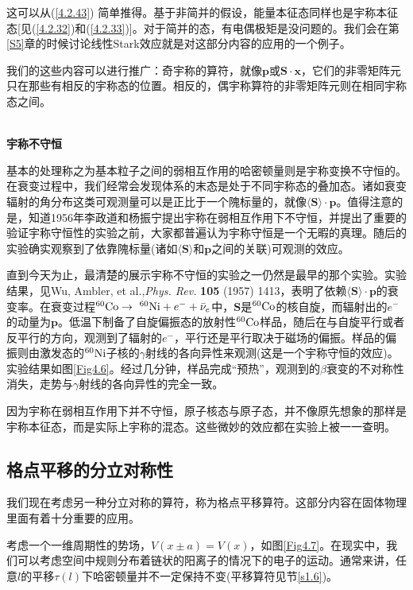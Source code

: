 \documentclass[UTF8,twoside]{ctexart}
\begin{document}
\noindent 这可以从(\ref{4.2.43}) 简单推得。基于非简并的假设，能量本征态同样也是宇称本征态[见(\ref{4.2.32})和(\ref{4.2.33})]。对于简并的态，有电偶极矩是没问题的。我们会在第{\ref{S5}}章的时候讨论线性Stark效应就是对这部分内容的应用的一个例子。

我们的这些内容可以进行推广：奇宇称的算符，就像$\bm{p}$或$\bm{S}\cdot\bm{x}$，它们的非零矩阵元只在那些有相反的宇称态的位置。相反的，偶宇称算符的非零矩阵元则在相同宇称态之间。

\ \\

\noindent \textbf{宇称不守恒}

\noindent 基本的处理称之为基本粒子之间的弱相互作用的哈密顿量则是宇称变换不守恒的。在衰变过程中，我们经常会发现体系的末态是处于不同宇称态的叠加态。诸如衰变辐射的角分布这类可观测量可以是正比于一个隗标量的，就像$\langle\bm{S}\rangle\cdot\bm{p}$。值得注意的是，知道1956年李政道和杨振宁提出宇称在弱相互作用下不守恒，并提出了重要的验证宇称守恒性的实验之前，大家都普遍认为宇称守恒是一个无暇的真理。随后的实验确实观察到了依靠隗标量(诸如$\langle \bm{S}\rangle$和$\bm{p}$之间的关联)可观测的效应。

直到今天为止，最清楚的展示宇称不守恒的实验之一仍然是最早的那个实验。实验结果，见Wu, Ambler, et al.,\emph{Phys. Rev. }\textbf{105} (1957) 1413，表明了依赖$\langle \bm{S}\rangle \cdot \bm{p}$的衰变率。在衰变过程$^{60}\ce{Co}\rightarrow\ ^{60}\ce{Ni}+e^-+\bar{\nu}_e$中，$\bm{S}$是$^{60}\ce{Co}$的核自旋，而辐射出的$e^-$的动量为$\bm{p}$。低温下制备了自旋偏振态的放射性$^{60}\ce{Co}$样品，随后在与自旋平行或者反平行的方向，观测到了辐射的$e^-$，平行还是平行取决于磁场的偏振。样品的偏振则由激发态的$^{60}\ce{Ni}$子核的$\gamma$射线的各向异性来观测(这是一个宇称守恒的效应)。实验结果如图{\ref{Fig4.6}}。经过几分钟，样品完成``预热''，观测到的$\beta$衰变的不对称性消失，走势与$\gamma$射线的各向异性的完全一致。

因为宇称在弱相互作用下并不守恒，原子核态与原子态，并不像原先想象的那样是宇称本征态，而是实际上宇称的混态。这些微妙的效应都在实验上被一一查明。

\subsection{格点平移的分立对称性}

\noindent 我们现在考虑另一种分立对称的算符，称为格点平移算符。这部分内容在固体物理里面有着十分重要的应用。

考虑一个一维周期性的势场，$V(x\pm a) = V(x)$，如图{\ref{Fig4.7}}。在现实中，我们可以考虑空间中规则分布着链状的阳离子的情况下的电子的运动。通常来讲，任意$l$的平移$\tau(l)$下哈密顿量并不一定保持不变(平移算符见节{\ref{s1.6}})。
\end{document}
